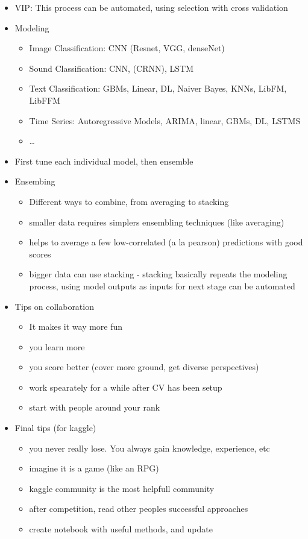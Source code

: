 \documentclass[a4paper]{report}
\begin{document}
\begin{itemize}
\begin{itemize}
    \end{itemize}
  \item VIP: This process can be automated, using selection with cross validation
  \item Modeling
    \begin{itemize}
      \item Image Classification: CNN (Resnet, VGG, denseNet)
      \item Sound Classification: CNN, (CRNN), LSTM
      \item Text Classification: GBMs, Linear, DL, Naiver Bayes, KNNs, LibFM, LibFFM
      \item Time Series: Autoregressive Models, ARIMA, linear, GBMs, DL, LSTMS
      \item \dots 
    \end{itemize}
  \item First tune each individual model, then ensemble
  \item Ensembing
    \begin{itemize}
      \item Different ways to combine, from averaging to stacking
      \item smaller data requires simplers ensembling techniques (like averaging)
      \item helps to average a few low-correlated (a la pearson) predictions with good scores
      \item bigger data can use stacking - stacking basically repeats the modeling process, using model outputs as inputs for next stage
	\subitem can be automated
    \end{itemize}
  \item Tips on collaboration
    \begin{itemize}
      \item It makes it way more fun
      \item you learn more
      \item you score better (cover more ground, get diverse perspectives)
      \item work spearately for a while after CV has been setup
      \item start with people around your rank
    \end{itemize}	
  \item Final tips (for kaggle)
    \begin{itemize}
      \item you never really lose. You always gain knowledge, experience, etc
      \item imagine it is a game (like an RPG)
      \item kaggle community is the most helpfull community
      \item after competition, read other peoples successful approaches
      \item create notebook with useful methods, and update
    \end{itemize}
\end{itemize}
\end{document}
